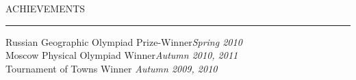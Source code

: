 \documentclass{resume} %
\renewenvironment{rSection}[1]{
\sectionskip
\textcolor{RoyalPurple}{\MakeUppercase{#1}}
\sectionlineskip
\hrule
\begin{list}{}{
\setlength{\leftmargin}{1.5em}
}
\item[]
}{
\end{list}
}
\begin{document}
\begin{rSection}{Achievements} \itemsep -2pt
{Russian Geographic Olympiad Prize-Winner}\hfill {\em Spring 2010}\\
{Moscow Physical Olympiad Winner}\hfill {\em Autumn 2010, 2011}\\
{Tournament of Towns Winner} \hfill {\em Autumn 2009, 2010} \\
\end{rSection}


\end{document}
